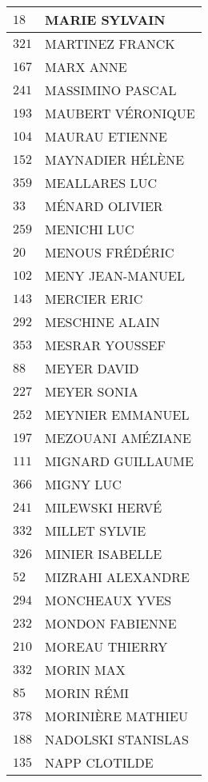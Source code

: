 \begin{xltabular}{\linewidth}{|l|X|}
    \hline
    $18$ & MARIE SYLVAIN \\
    \hline
    $321$ & MARTINEZ FRANCK \\
    \hline
    $167$ & MARX ANNE \\
    \hline
    $241$ & MASSIMINO PASCAL \\
    \hline
    $193$ & MAUBERT VÉRONIQUE \\
    \hline
    $104$ & MAURAU ETIENNE \\
    \hline
    $152$ & MAYNADIER HÉLÈNE \\
    \hline
    $359$ & MEALLARES LUC \\
    \hline
    $33$ & MÉNARD OLIVIER \\
    \hline
    $259$ & MENICHI LUC \\
    \hline
    $20$ & MENOUS FRÉDÉRIC \\
    \hline
    $102$ & MENY JEAN-MANUEL \\
    \hline
    $143$ & MERCIER ERIC \\
    \hline
    $292$ & MESCHINE ALAIN \\
    \hline
    $353$ & MESRAR YOUSSEF \\
    \hline
    $88$ & MEYER DAVID \\
    \hline
    $227$ & MEYER SONIA \\
    \hline
    $252$ & MEYNIER EMMANUEL \\
    \hline
    $197$ & MEZOUANI AMÉZIANE \\
    \hline
    $111$ & MIGNARD GUILLAUME \\
    \hline
    $366$ & MIGNY LUC \\
    \hline
    $241$ & MILEWSKI HERVÉ \\
    \hline
    $332$ & MILLET SYLVIE \\
    \hline
    $326$ & MINIER ISABELLE \\
    \hline
    $52$ & MIZRAHI ALEXANDRE \\
    \hline
    $294$ & MONCHEAUX YVES \\
    \hline
    $232$ & MONDON FABIENNE \\
    \hline
    $210$ & MOREAU THIERRY \\
    \hline
    $332$ & MORIN MAX \\
    \hline
    $85$ & MORIN RÉMI \\
    \hline
    $378$ & MORINIÈRE MATHIEU \\
    \hline
    $188$ & NADOLSKI STANISLAS \\
    \hline
    $135$ & NAPP CLOTILDE \\

\end{xltabular}
